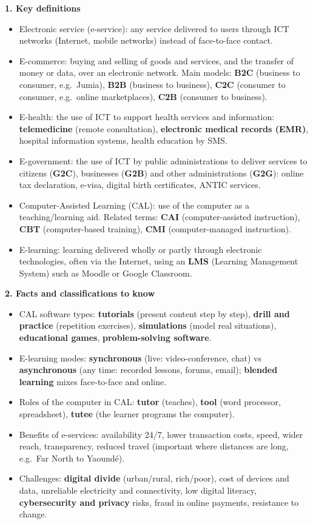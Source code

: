 \documentclass[11pt]{article}
\newcommand{\cle}[1]{{\popxbold\color{popdark}#1}}
\begin{document}
\begin{bilan}
\textbf{1. Key definitions}
\begin{itemize}
  \item \cle{Electronic service (e-service)}: any service delivered to users through ICT networks (Internet, mobile networks) instead of face-to-face contact.
  \item \cle{E-commerce}: buying and selling of goods and services, and the transfer of money or data, over an electronic network. Main models: \textbf{B2C} (business to consumer, e.g.\ Jumia), \textbf{B2B} (business to business), \textbf{C2C} (consumer to consumer, e.g.\ online marketplaces), \textbf{C2B} (consumer to business).
  \item \cle{E-health}: the use of ICT to support health services and information: \textbf{telemedicine} (remote consultation), \textbf{electronic medical records (EMR)}, hospital information systems, health education by SMS.
  \item \cle{E-government}: the use of ICT by public administrations to deliver services to citizens (\textbf{G2C}), businesses (\textbf{G2B}) and other administrations (\textbf{G2G}): online tax declaration, e-visa, digital birth certificates, ANTIC services.
  \item \cle{Computer-Assisted Learning (CAL)}: use of the computer as a teaching/learning aid. Related terms: \textbf{CAI} (computer-assisted instruction), \textbf{CBT} (computer-based training), \textbf{CMI} (computer-managed instruction).
  \item \cle{E-learning}: learning delivered wholly or partly through electronic technologies, often via the Internet, using an \textbf{LMS} (Learning Management System) such as Moodle or Google Classroom.
\end{itemize}

\textbf{2. Facts and classifications to know}
\begin{itemize}
  \item CAL software types: \textbf{tutorials} (present content step by step), \textbf{drill and practice} (repetition exercises), \textbf{simulations} (model real situations), \textbf{educational games}, \textbf{problem-solving software}.
  \item E-learning modes: \textbf{synchronous} (live: video-conference, chat) vs \textbf{asynchronous} (any time: recorded lessons, forums, email); \textbf{blended learning} mixes face-to-face and online.
  \item Roles of the computer in CAL: \textbf{tutor} (teaches), \textbf{tool} (word processor, spreadsheet), \textbf{tutee} (the learner programs the computer).
  \item Benefits of e-services: availability 24/7, lower transaction costs, speed, wider reach, transparency, reduced travel (important where distances are long, e.g.\ Far North to Yaound\'e).
  \item Challenges: \textbf{digital divide} (urban/rural, rich/poor), cost of devices and data, unreliable electricity and connectivity, low digital literacy, \textbf{cybersecurity and privacy} risks, fraud in online payments, resistance to change.
\end{itemize}


\end{bilan}
\end{document}
